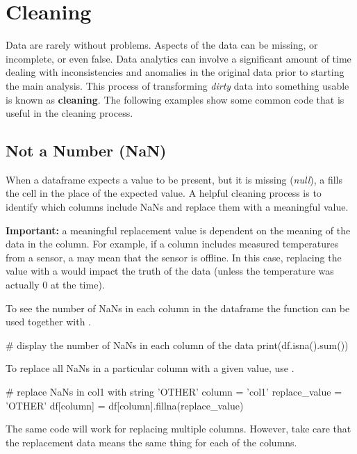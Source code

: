 \chapter{Cleaning}
\label{chapter:cleaning}

Data are rarely without problems. Aspects of the data can be missing, or incomplete, or even false. Data analytics can involve a significant amount of time dealing with inconsistencies and anomalies in the original data prior to starting the main analysis. This process of transforming \textit{dirty} data into something usable is known as \textbf{cleaning}. The following examples show some common code that is useful in the cleaning process.

\section{Not a Number (NaN)}

When a dataframe expects a value to be present, but it is missing (\textit{null}), a  fills the cell in the place of the expected value. A helpful cleaning process is to identify which columns include NaNs and replace them with a meaningful value.

\textbf{Important:} a meaningful replacement value is dependent on the meaning of the data in the column. For example, if a column includes measured temperatures from a sensor, a  may mean that the sensor is offline. In this case, replacing the value with a  would impact the truth of the data (unless the temperature was actually 0 at the time).

To see the number of NaNs in each column in the dataframe the  function can be used together with .

\begin{pycode}
    # display the number of NaNs in each column of the data
    print(df.isna().sum())
\end{pycode}

To replace all NaNs in a particular column with a given value, use .

\begin{pycode}
    # replace NaNs in col1 with string 'OTHER'
    column = 'col1'
    replace_value = 'OTHER'
    df[column] = df[column].fillna(replace_value)
\end{pycode}

The same code will work for replacing multiple columns. However, take care that the replacement data means the same thing for each of the columns.

